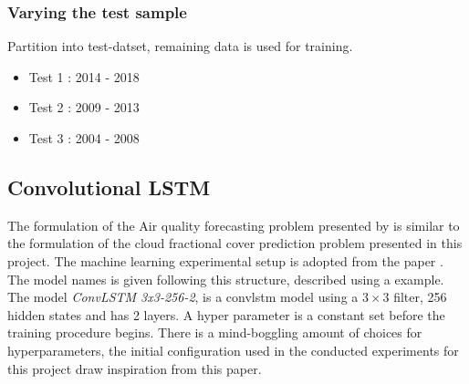 \begin{table}[h]
    \centering
    \caption{Configuration of \acrshort{ar}-models. $\times$ denoted not applied, \checked denotes applied}
    \label{tab:ar_model_config}
\end{table}


\subsubsection{Varying the test sample}
Partition into test-datset, remaining data is used for training. 
\begin{itemize}[noitemsep, topsep=0pt]
    \item Test 1 : 2014 - 2018
    \item Test 2 : 2009 - 2013
    \item Test 3 : 2004 - 2008
\end{itemize}

\subsection{Convolutional LSTM}
The formulation of the Air quality forecasting problem presented by  \citeauthor{SunAirLSTM} is similar to the formulation of the cloud fractional cover prediction problem presented in this project. The machine learning experimental setup is adopted from the paper . The model names is given following this structure, described using a example. The model \textit{ConvLSTM 3x3-256-2}, is a \acrshort{convlstm} model using a $3\times 3$ filter, 256 hidden states and has 2 layers. A hyper parameter is a constant set before the training procedure begins. There is a mind-boggling amount of choices for hyperparameters, the initial configuration used in the conducted experiments for this project draw inspiration from this paper. 

